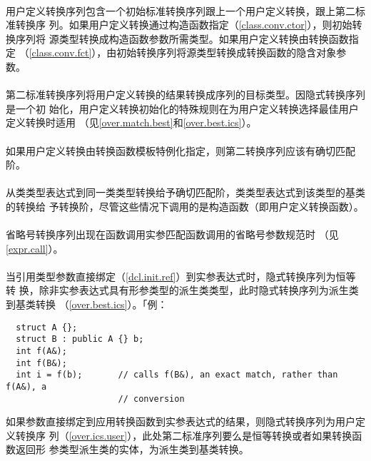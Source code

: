 \paragraph{}
用户定义转换序列包含一个初始标准转换序列跟上一个用户定义转换，跟上第二标准转换序
列。如果用户定义转换通过构造函数指定（\ref{class.conv.ctor}），则初始转换序列将
源类型转换成构造函数参数所需类型。如果用户定义转换由转换函数指定
（\ref{class.conv.fct}），由初始转换序列将源类型转换成转换函数的隐含对象参数。

\paragraph{}
第二标准转换序列将用户定义转换的结果转换成序列的目标类型。因隐式转换序列是一个初
始化，用户定义转换初始化的特殊规则在为用户定义转换选择最佳用户定义转换时适用
（见\ref{over.match.best}和\ref{over.best.ics}）。

\paragraph{}
如果用户定义转换由转换函数模板特例化指定，则第二转换序列应该有确切匹配阶。

\paragraph{}
从类类型表达式到同一类类型转换给予确切匹配阶，类类型表达式到该类型的基类的转换给
予转换阶，尽管这些情况下调用的是构造函数（即用户定义转换函数）。

\paragraph{}
省略号转换序列出现在函数调用实参匹配函数调用的省略号参数规范时
（见\ref{expr.call}）。

\paragraph{}
当引用类型参数直接绑定（\ref{dcl.init.ref}）到实参表达式时，隐式转换序列为恒等转
换，除非实参表达式具有形参类型的派生类类型，此时隐式转换序列为派生类到基类转换
（\ref{over.best.ics}）。「例：
\begin{lstlisting}
  struct A {};
  struct B : public A {} b;
  int f(A&);
  int f(B&);
  int i = f(b);       // calls f(B&), an exact match, rather than f(A&), a
                      // conversion
\end{lstlisting}
如果参数直接绑定到应用转换函数到实参表达式的结果，则隐式转换序列为用户定义转换序
列（\ref{over.ics.user}），此处第二标准序列要么是恒等转换或者如果转换函数返回形
参类型派生类的实体，为派生类到基类转换。

